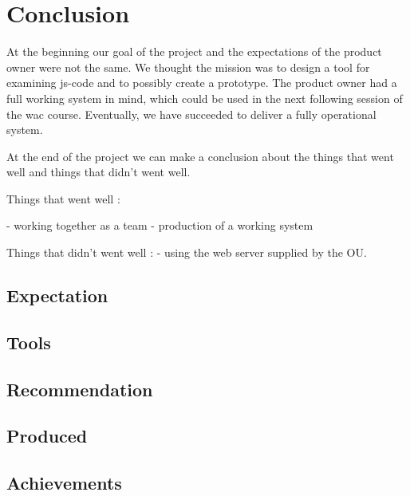
\chapter{Conclusion}

At the beginning our goal of the project and the expectations of the product
owner were not the same.
We thought the mission was to design a tool for examining \gls{js-code} and to
possibly create a prototype.
The product owner had a full working system in mind, which could be used in
the next following session of the \gls{wac} course.
Eventually, we have succeeded to deliver a fully operational system.

At the end of the project we can make a conclusion about the things that went
well and things that didn't went well.

Things that went well :

- working together as a team
- production of a working system

Things that didn't went well :
- using the web server supplied by the OU.


\section{Expectation}

\section{Tools}

\section{Recommendation}

\section{Produced}

\section{Achievements}
